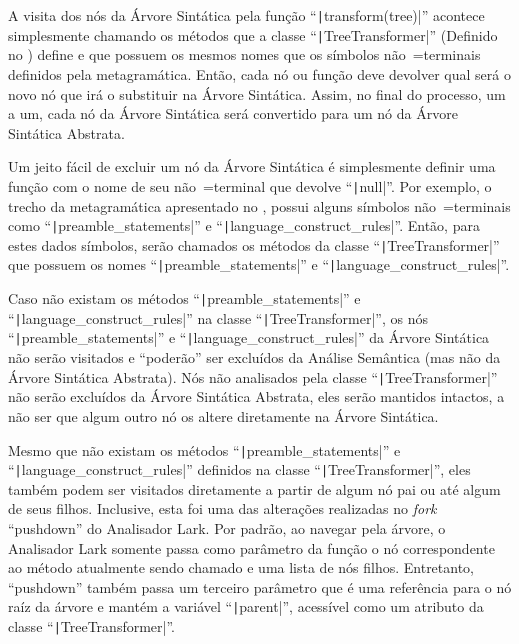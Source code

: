 A visita dos nós da Árvore Sintática pela função ``\texttt|transform(tree)|'' acontece simplesmente chamando os métodos que a classe ``\texttt|TreeTransformer|'' (Definido no ) define e
que possuem os mesmos nomes que os símbolos não~=terminais definidos pela metagramática.
Então,
cada nó ou
função deve devolver qual será o novo nó que irá o substituir na Árvore Sintática.
Assim,
no final do processo,
um a um,
cada nó da Árvore Sintática será convertido para um nó da Árvore Sintática Abstrata.

Um jeito fácil de excluir um nó da Árvore Sintática é simplesmente definir uma função com o nome de seu não~=terminal que devolve ``\texttt|null|''.
Por exemplo,
o trecho da metagramática apresentado no ,
possui alguns símbolos não~=terminais como ``\texttt|preamble_statements|'' e
``\texttt|language_construct_rules|''. Então,
para estes dados símbolos,
serão chamados os métodos da classe ``\texttt|TreeTransformer|'' que possuem os nomes ``\texttt|preamble_statements|'' e
``\texttt|language_construct_rules|''.

Caso não existam os métodos ``\texttt|preamble_statements|'' e
``\texttt|language_construct_rules|'' na classe ``\texttt|TreeTransformer|'',
os nós ``\texttt|preamble_statements|'' e
``\texttt|language_construct_rules|'' da Árvore Sintática não serão visitados e
``poderão'' ser excluídos da Análise Semântica (mas não da Árvore Sintática Abstrata).
Nós não analisados pela classe ``\texttt|TreeTransformer|'' não serão excluídos da Árvore Sintática Abstrata,
eles serão mantidos intactos,
a não ser que algum outro nó os altere diretamente na Árvore Sintática.

Mesmo que não existam os métodos ``\texttt|preamble_statements|'' e
``\texttt|language_construct_rules|'' definidos na classe ``\texttt|TreeTransformer|'',
eles também podem ser visitados diretamente a partir de algum nó pai ou
até algum de seus filhos.
Inclusive,
esta foi uma das alterações realizadas no \textit{fork} ``pushdown'' do Analisador Lark.
Por padrão,
ao navegar pela árvore,
o Analisador Lark somente passa como parâmetro da função o nó correspondente ao método atualmente sendo chamado e
uma lista de nós filhos.
Entretanto,
``pushdown'' também passa um terceiro parâmetro que é uma referência para o nó raíz da árvore e
mantém a variável ``\texttt|parent|'',
acessível como um atributo da classe ``\texttt|TreeTransformer|''.


